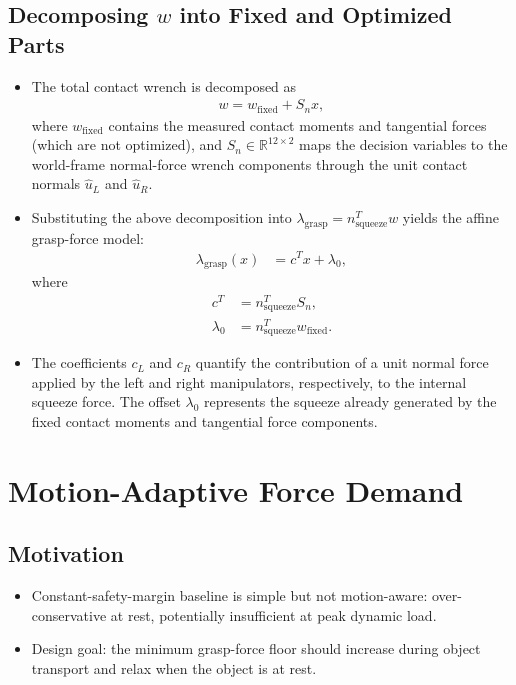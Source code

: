 \documentclass[conference]{IEEEtran}
\begin{document}
\subsection{Decomposing $w$ into Fixed and Optimized Parts}
\begin{itemize}
    \item The total contact wrench is decomposed as
    \begin{align}
        w = w_{\mathrm{fixed}} + S_n x,
    \end{align}
    where \(w_{\mathrm{fixed}}\) contains the measured contact moments and
    tangential forces (which are not optimized), and
    \(S_n \in \mathbb{R}^{12 \times 2}\) maps the decision variables to the
    world-frame normal-force wrench components through the unit contact normals
    \(\hat{u}_L\) and \(\hat{u}_R\).

    \item Substituting the above decomposition into
    \(\lambda_{\mathrm{grasp}} = n_{\mathrm{squeeze}}^{T} w\) yields the affine
    grasp-force model:
    \begin{align}
        \lambda_{\mathrm{grasp}}(x)
        &= c^{T} x + \lambda_{0},
    \end{align}
    where
    \begin{align}
        c^{T} &= n_{\mathrm{squeeze}}^{T} S_n, \\
        \lambda_{0} &= n_{\mathrm{squeeze}}^{T} w_{\mathrm{fixed}}.
    \end{align}

    \item The coefficients \(c_L\) and \(c_R\) quantify the contribution of a
    unit normal force applied by the left and right manipulators,
    respectively, to the internal squeeze force. The offset
    \(\lambda_{0}\) represents the squeeze already generated by the fixed
    contact moments and tangential force components.
\end{itemize}


\section{Motion-Adaptive Force Demand}
\subsection{Motivation}
\begin{itemize}
    \item Constant-safety-margin baseline is simple but not motion-aware: over-conservative at rest, potentially insufficient at peak dynamic load.

    \item Design goal: the minimum grasp-force floor should increase during object transport and relax when the object is at rest.
\end{itemize}
\end{document}
